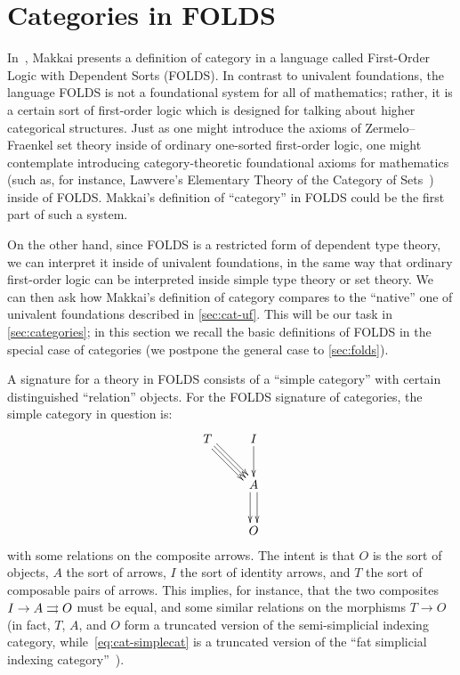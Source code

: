 \documentclass{amsart}
\begin{document}
\section{Categories in FOLDS}
\label{sec:categories-folds}

In~\cite{makkai:folds}, Makkai presents a definition of category in a language called First-Order Logic with Dependent Sorts (FOLDS).
In contrast to univalent foundations, the language FOLDS is not a foundational system for all of mathematics; rather, it is a certain sort of first-order logic which is designed for talking about higher categorical structures.
Just as one might introduce the axioms of Zermelo--Fraenkel set theory inside of ordinary one-sorted first-order logic, one might contemplate introducing category-theoretic foundational axioms for mathematics (such as, for instance, Lawvere's Elementary Theory of the Category of Sets~\cite{lawvere:etcs-long}) inside of FOLDS.
Makkai's definition of ``category'' in FOLDS could be the first part of such a system.

On the other hand, since FOLDS is a restricted form of dependent type theory, we can interpret it inside of univalent foundations, in the same way that ordinary first-order logic can be interpreted inside simple type theory or set theory.
We can then ask how Makkai's definition of category compares to the ``native'' one of univalent foundations described in \autoref{sec:cat-uf}.
This will be our task in \autoref{sec:categories}; in this section we recall the basic definitions of FOLDS in the special case of categories (we postpone the general case to \autoref{sec:folds}).

A signature for a theory in FOLDS consists of a ``simple category'' with certain distinguished ``relation'' objects.
For the FOLDS signature of categories, the simple category in question is:
\begin{equation}
  \vcenter{\xymatrix{
      T \ar[dr] \ar@<1mm>[dr] \ar@<-1mm>[dr] & I \ar[d] \\
      & A \ar@<1mm>[d] \ar@<-1mm>[d] \\
      & O}}\label{eq:cat-simplecat}
\end{equation}
with some relations on the composite arrows.
The intent is that $O$ is the sort of objects, $A$ the sort of arrows, $I$ the sort of identity arrows, and $T$ the sort of composable pairs of arrows.
This implies, for instance, that the two composites $I\to A\rightrightarrows O$ must be equal, and some similar relations on the morphisms $T\to O$ (in fact, $T$, $A$, and $O$ form a truncated version of the semi-simplicial indexing category, while~\eqref{eq:cat-simplecat} is a truncated version of the ``fat simplicial indexing category''~\cite{kock:weakids}).
\end{document}
